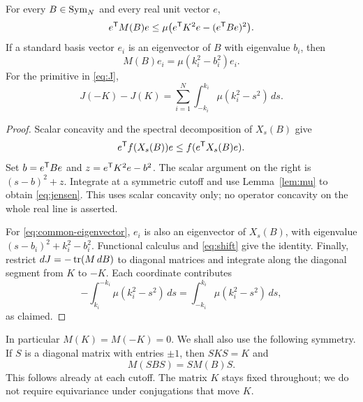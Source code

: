 \begin{lemma}\label{lem:jensen}
For every $B\in\operatorname{Sym}_N$ and every real unit vector $e$,
\begin{equation}\label{eq:jensen}
 e^{\mathsf T}M(B)e\le
 \mu\bigl(e^{\mathsf T}K^2e-(e^{\mathsf T}Be)^2\bigr).
\end{equation}
If a standard basis vector $e_i$ is an eigenvector of $B$ with eigenvalue
$b_i$, then
\begin{equation}\label{eq:common-eigenvector}
 M(B)e_i=\mu(k_i^2-b_i^2)e_i.
\end{equation}
For the primitive in \eqref{eq:J},
\begin{equation}\label{eq:boundary-J}
 J(-K)-J(K)=\sum_{i=1}^N\int_{-k_i}^{k_i}\mu(k_i^2-s^2)\,ds.
\end{equation}
\end{lemma}
\begin{proof}
Scalar concavity and the spectral decomposition of $X_s(B)$ give
\[
 e^{\mathsf T}f(X_s(B))e\le f(e^{\mathsf T}X_s(B)e).
\]
Set $b=e^{\mathsf T}Be$ and $z=e^{\mathsf T}K^2e-b^2$. The scalar argument
on the right is $(s-b)^2+z$. Integrate at a symmetric cutoff and use
Lemma~\ref{lem:mu} to obtain \eqref{eq:jensen}. This uses scalar concavity
only; no operator concavity on the whole real line is asserted.

For \eqref{eq:common-eigenvector}, $e_i$ is also an eigenvector of $X_s(B)$,
with eigenvalue $(s-b_i)^2+k_i^2-b_i^2$. Functional calculus and
\eqref{eq:shift} give the identity. Finally, restrict $dJ=-\operatorname{tr}(M\,dB)$ to
diagonal matrices and integrate along the diagonal segment from $K$ to
$-K$. Each coordinate contributes
\[
 -\int_{k_i}^{-k_i}\mu(k_i^2-s^2)\,ds
 =\int_{-k_i}^{k_i}\mu(k_i^2-s^2)\,ds,
\]
as claimed.
\end{proof}

In particular $M(K)=M(-K)=0$. We shall also use the following symmetry.
If $S$ is a diagonal matrix with entries $\pm1$, then $SKS=K$ and
\begin{equation}\label{eq:sign-equivariance}
 M(SBS)=SM(B)S.
\end{equation}
This follows already at each cutoff. The matrix $K$ stays fixed throughout;
we do not require equivariance under conjugations that move $K$.
